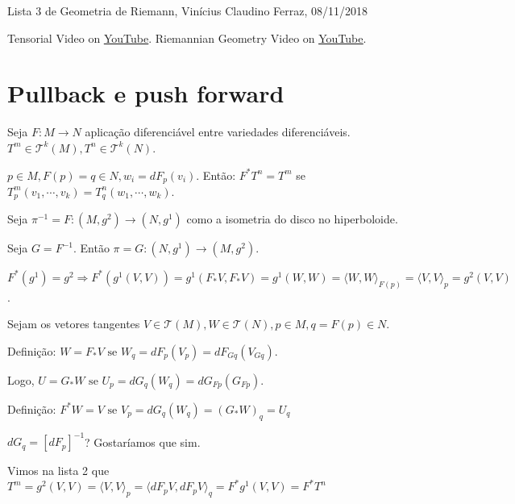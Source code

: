 \documentclass[10pt,a4paper]{article}
\begin{document}
	\Large

	\begin{center}
		Lista 3 de Geometria de Riemann, Vin\'icius Claudino Ferraz, 08/11/2018
	\end{center}

	\normalsize

Tensorial Video on \href{https://www.youtube.com/watch?v=mmzqmIcX7xo}{\color{blue}\underline{YouTube}}. Riemannian Geometry Video on \href{https://www.youtube.com/watch?v=Z3IXeWvEEa4}{\color{blue}\underline{YouTube}}.

	\section{Pullback e push forward}
		\begin{flushright}
		\end{flushright}

		Seja $F: M \rightarrow N$ aplica\c{c}\~ao diferenci\'avel entre variedades diferenci\'aveis.  $T^m \in \mathcal{T}^k(M), T^n \in \mathcal{T}^k(N)$.

		$p \in M, F(p) = q \in N, w_i = dF_p (v_i)$. Ent\~ao: $F^* T^n = T^m$ se $T^m_p (v_1, \cdots, v_k) = T_q^n (w_1, \cdots, w_k)$.

		\vspace{3mm}

		Seja $\pi^{-1} = F: (M,g^2) \rightarrow (N, g^1)$ como a isometria do disco no hiperboloide.

		Seja $G = F^{-1}$. Ent\~ao $\pi = G: (N,g^1) \rightarrow (M, g^2)$.

		$F^*(g^1) = g^2 \Rightarrow F^*(g^1(V,V)) = g^1(F_* V, F_* V) = g^1(W, W) = \langle W, W \rangle_{F(p)} = \langle V, V \rangle_p = g^2(V,V)$.

		Sejam os vetores tangentes $V \in \mathcal{T}(M), W \in \mathcal{T}(N), p \in M, q = F(p) \in N$.

		Defini\c{c}\~ao: $W = F_* V \text{ se } W_q = dF_p (V_p) = dF_{G q} (V_{G q})$.

		Logo, $U = G_* W \text{ se } U_p = dG_q (W_q) = dG_{F p} (G_{F p})$.

		Defini\c{c}\~ao: $F^* W = V \text{ se } V_p = dG_q (W_q) = (G_* W)_q = U_q$

		$dG_q = [dF_p]^{-1}$? Gostar\'iamos que sim.

		\vspace{3mm}

		Vimos na lista 2 que $T^m = g^2(V, V) = \langle V, V \rangle_p = \langle dF_p V, dF_p V\rangle_q = F^* g^1(V,V) = F^* T^n$
\end{document}
